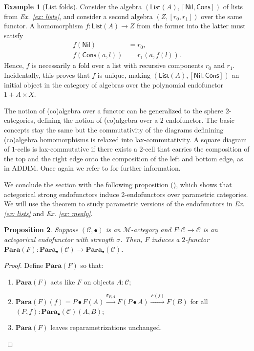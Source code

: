 \documentclass[11pt,a4paper,openright,twoside]{report}
\theoremstyle{plain}
\newtheorem{proposition}{Proposition}
\theoremstyle{definition}
\newtheorem{example}[proposition]{Example}
\begin{document}
\begin{example}[List folds]
  \label{ex: listfold}
  Consider the algebra $(\mathsf{List}(A), [\mathsf{Nil}, \mathsf{Cons}])$ of lists from \textit{Ex. \ref{ex: lists}}, and consider a second algebra $(Z, [r_0,r_1])$ over the same functor. A homomorphism $f: \mathsf{List}(A) \to Z$ from the former into the latter must satisfy 
  \begin{align*}
    f(\mathsf{Nil}) &= r_0,\\
    f(\mathsf{Cons}(a,l)) &= r_1(a,f(l)). 
  \end{align*}
  Hence, $f$ is necessarily a fold over a list with recursive components $r_0$ and $r_1$. Incidentally, this proves that $f$ is unique, making $(\mathsf{List}(A), [\mathsf{Nil}, \mathsf{Cons}])$ an initial object in the category of algebras over the polynomial endofunctor $1 + A \times X$.
\end{example}

The notion of (co)algebra over a functor can be generalized to the sphere $2$-categories, defining the notion of (co)algebra over a $2$-endofunctor. The basic concepts stay the same but the commutativity of the diagrams definining (co)algebra homomorphisms is relaxed into lax-commutativity. A square diagram of $1$-cells is lax-commutative if there exists a $2$-cell that carries the composition of the top and the right edge onto the composition of the left and bottom edge, as in ADDIM. Once again we refer to \cite{gavranovicposition} for further information.


We conclude the section with the following proposition (\cite{gavranovicposition}), which shows that actegorical strong endofunctors induce $2$-endofunctors over parametric categories. We will use the theorem to study parametric versions of the endofunctors in \textit{Ex. \ref{ex: lists}} and \textit{Ex. \ref{ex: mealy}}.

\begin{proposition}
  \label{prop: paraend}
  Suppose $(\mathcal{C}, \bullet)$ is an $\mathcal{M}$-actegory and $F: \mathcal{C} \to \mathcal{C}$ is an actegorical endofunctor with strength $\sigma$. Then, $F$ induces a  $2$-functor $\mathbf{Para}(F): \mathbf{Para}_{\bullet}(\mathcal{C}) \to \mathbf{Para}_{\bullet}(\mathcal{C})$.
\end{proposition}
\begin{proof}
  Define $\mathbf{Para}(F)$ so that: 
  \begin{enumerate}
    \item $\mathbf{Para}(F)$ acts like $F$ on objects $A: \mathcal{C}$;
    \item $\mathbf{Para}(F)(f) = P \bullet F(A) \stackrel{\sigma_{P,A}}{\longrightarrow} F(P \bullet A) \stackrel{F(f)}{\longrightarrow} F(B)$ for all $(P,f):\mathbf{Para}_{\bullet}(\mathcal{C})(A,B)$;
    \item $\mathbf{Para}(F)$ leaves reparametrizations unchanged.
  \end{enumerate}
\end{proof}
\end{document}
